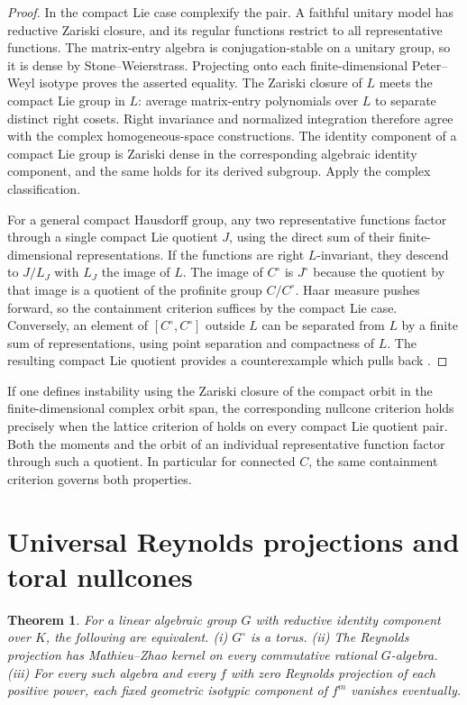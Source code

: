 \documentclass[11pt]{article}
\newtheorem{theorem}{Theorem}[section]
\begin{document}
\begin{proof}
In the compact Lie case complexify the pair. A faithful unitary
model has reductive Zariski closure, and its regular functions
restrict to all representative functions. The matrix-entry algebra
is conjugation-stable on a unitary group, so it is dense by
Stone--Weierstrass. Projecting onto each finite-dimensional
Peter--Weyl isotype proves the asserted equality. The Zariski
closure of \(L\) meets the compact Lie group in \(L\): average
matrix-entry polynomials over \(L\) to separate distinct right
cosets. Right invariance and normalized integration therefore agree
with the complex homogeneous-space constructions. The identity
component of a compact Lie group is Zariski dense in the corresponding
algebraic identity component, and the same holds for its derived
subgroup. Apply the complex classification.

For a general compact Hausdorff group, any two representative functions
factor through a single compact Lie quotient \(J\), using the direct
sum of their finite-dimensional representations. If the functions
are right \(L\)-invariant, they descend to \(J/L_J\) with
\(L_J\) the image of \(L\). The image of \(C^\circ\) is \(J^\circ\)
because the quotient by that image is a quotient of the profinite
group \(C/C^\circ\). Haar measure pushes forward, so the containment
criterion suffices by the compact Lie case. Conversely, an element
of \([C^\circ,C^\circ]\) outside \(L\) can be separated from \(L\)
by a finite sum of representations, using point separation and
compactness of \(L\). The resulting compact Lie quotient provides
a counterexample which pulls back \cite{Fausk}.
\end{proof}

If one defines instability using the Zariski closure of the compact
orbit in the finite-dimensional complex orbit span, the corresponding
nullcone criterion holds precisely when the lattice criterion of
\cite[Section~7]{Complex} holds on every compact Lie quotient pair.
Both the moments and the orbit of an individual representative
function factor through such a quotient. In particular for connected
\(C\), the same containment criterion governs both properties.

\section{Universal Reynolds projections and toral nullcones}

\begin{theorem}\label{thm:universal}
For a linear algebraic group \(G\) with reductive identity component
over \(K\), the following are equivalent.
\textup{(i)} \(G^\circ\) is a torus.
\textup{(ii)} The Reynolds projection has Mathieu--Zhao kernel on every
commutative rational \(G\)-algebra.
\textup{(iii)} For every such algebra and every \(f\) with zero Reynolds
projection of each positive power, each fixed geometric isotypic
component of \(f^m\) vanishes eventually.
\end{theorem}
\end{document}
